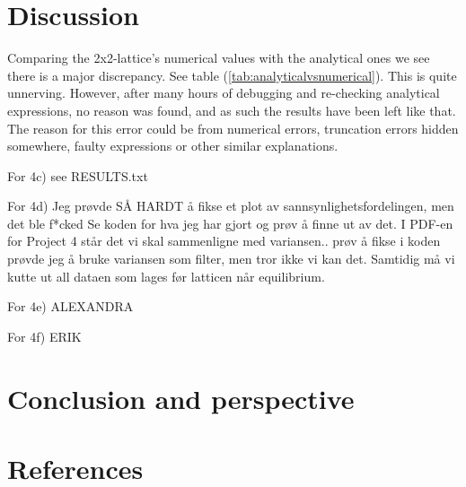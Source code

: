 \documentclass{article}
\begin{document}
\vspace{1cm}

\clearpage
\newpage

\section{Discussion} \label{sec:Discussion}

Comparing the 2x2-lattice's numerical values with the analytical ones we see there is a major discrepancy. See table (\ref{tab:analyticalvsnumerical}). This is quite unnerving. However, after many hours of debugging and re-checking analytical expressions, no reason was found, and as such the results have been left like that. The reason for this error could be from numerical errors, truncation errors hidden somewhere, faulty expressions or other similar explanations.

For 4c) see RESULTS.txt

For 4d) Jeg prøvde SÅ HARDT å fikse et plot av sannsynlighetsfordelingen, men det ble f*cked
Se koden for hva jeg har gjort og prøv å finne ut av det.
I PDF-en for Project 4 står det vi skal sammenligne med variansen.. prøv å fikse
i koden prøvde jeg å bruke variansen som filter, men tror ikke vi kan det. Samtidig må vi kutte ut all dataen som lages før latticen når equilibrium.

For 4e) ALEXANDRA

For 4f) ERIK


\vspace{1cm}

\section{Conclusion and perspective} \label{sec:Conclusion}





\vspace{1cm}

\section{References} \label{sec:References}
\end{document}
